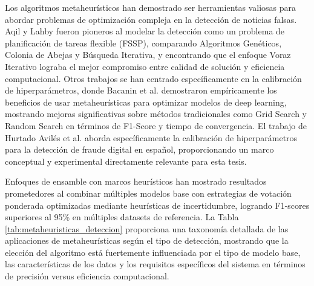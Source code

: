 Los algoritmos metaheurísticos han demostrado ser herramientas valiosas para abordar problemas de optimización compleja en la detección de noticias falsas. Aqil y Lahby \cite{aqil2021modeling} fueron pioneros al modelar la detección como un problema de planificación de tareas flexible (FSSP), comparando Algoritmos Genéticos, Colonia de Abejas y Búsqueda Iterativa, y encontrando que el enfoque Voraz Iterativo lograba el mejor compromiso entre calidad de solución y eficiencia computacional. Otros trabajos se han centrado específicamente en la calibración de hiperparámetros, donde Bacanin et al. \cite{bacanin2023benefits} demostraron empíricamente los beneficios de usar metaheurísticas para optimizar modelos de deep learning, mostrando mejoras significativas sobre métodos tradicionales como Grid Search y Random Search en términos de F1-Score y tiempo de convergencia. El trabajo de Hurtado Avilés et al. \cite{hurtado2024calibracion} aborda específicamente la calibración de hiperparámetros para la detección de fraude digital en español, proporcionando un marco conceptual y experimental directamente relevante para esta tesis.

Enfoques de ensamble con marcos heurísticos \cite{das2022heuristic} han mostrado resultados prometedores al combinar múltiples modelos base con estrategias de votación ponderada optimizadas mediante heurísticas de incertidumbre, logrando F1-scores superiores al 95\% en múltiples datasets de referencia. La Tabla \ref{tab:metaheuristicas_deteccion} proporciona una taxonomía detallada de las aplicaciones de metaheurísticas según el tipo de detección, mostrando que la elección del algoritmo está fuertemente influenciada por el tipo de modelo base, las características de los datos y los requisitos específicos del sistema en términos de precisión versus eficiencia computacional.

